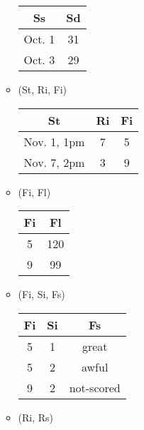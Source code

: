 \documentclass[12pt]{article}
\begin{document}
\begin{enumerate}
\begin{itemize}
\begin{center}
\begin{tabular}{c c}
                    Ss     & Sd \\
                    \hline
                    Oct. 1 & 31 \\
                    Oct. 3 & 29 \\
                    \hline                    
                  \end{tabular}
                \end{center}
          \item (St, Ri, Fi)
                \begin{center}
                  \begin{tabular}{c c c}
                    \hline
                    St          & Ri & Fi \\
                    \hline
                    Nov. 1, 1pm & 7  & 5  \\
                    Nov. 7, 2pm & 3  & 9  \\
                    \hline
                  \end{tabular}
                \end{center}
          \item (Fi, Fl)
                \begin{center}
                  \begin{tabular}{c c}
                    \hline
                    Fi & Fl \\
                    \hline
                    5  & 120 \\
                    9  & 99 \\
                    \hline                    
                  \end{tabular}
                \end{center}
          \item (Fi, Si, Fs)
                \begin{center}
                  \begin{tabular}{c c c}
                    \hline
                    Fi & Si & Fs \\
                    \hline
                    5  & 1  & great \\
                    5  & 2  & awful \\
                    9  & 2  & not-scored \\
                    \hline
                  \end{tabular}
                \end{center}
          \item (Ri, Rs)

\end{itemize}
\end{enumerate}
\end{document}
